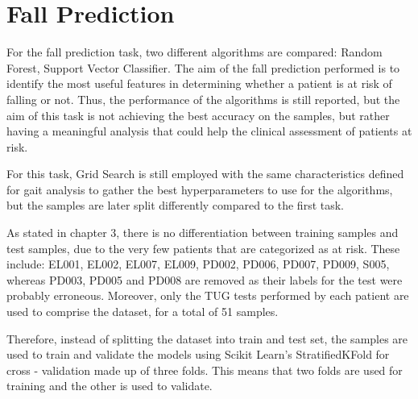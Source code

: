 \section{Fall Prediction}

For the fall prediction task, two different algorithms are compared: Random Forest, Support Vector Classifier.
The aim of the fall prediction performed is to identify the  most useful features in determining whether a patient is at risk of falling or not. Thus, the performance of the algorithms is still reported, but the aim of this task is not achieving the best accuracy on the samples, but rather having a meaningful analysis that could help the clinical assessment of patients at risk.


For this task, Grid Search is still employed with the same characteristics defined for gait analysis to gather the best hyperparameters to use for the algorithms, but the samples are later split differently compared to the first task.


As stated in chapter 3, there is no differentiation between training samples and test samples, due to the very few patients that are categorized as at risk. These include: EL001, EL002, EL007, EL009, PD002, PD006, PD007, PD009, S005, whereas PD003, PD005 and PD008 are removed as their labels for the test were probably erroneous. Moreover, only the TUG tests performed by each patient are used to comprise the dataset, for a total of 51 samples.

Therefore, instead of splitting the dataset into train and test set, the samples are used to train and validate the models using Scikit Learn's StratifiedKFold for cross - validation made up of three folds. This means that two folds are used for training and the other is used to validate. 

